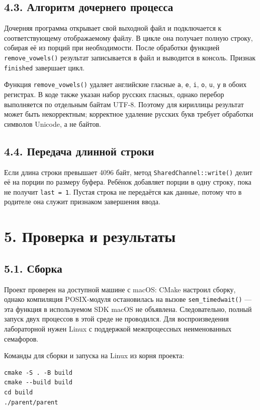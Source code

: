 \documentclass[12pt,a4paper]{article}
\begin{document}
\subsection*{4.3. Алгоритм дочернего процесса}
Дочерняя программа открывает свой выходной файл и подключается к соответствующему отображаемому файлу. В цикле она получает полную строку, собирая её из порций при необходимости. После обработки функцией \texttt{remove\_vowels()} результат записывается в файл и выводится в консоль. Признак \texttt{finished} завершает цикл.

Функция \texttt{remove\_vowels()} удаляет английские гласные \texttt{a}, \texttt{e}, \texttt{i}, \texttt{o}, \texttt{u}, \texttt{y} в обоих регистрах. В коде также указан набор русских гласных, однако перебор выполняется по отдельным байтам UTF-8. Поэтому для кириллицы результат может быть некорректным; корректное удаление русских букв требует обработки символов Unicode, а не байтов.

\subsection*{4.4. Передача длинной строки}
Если длина строки превышает 4096 байт, метод \texttt{SharedChannel::write()} делит её на порции по размеру буфера. Ребёнок добавляет порции в одну строку, пока не получит \texttt{last = 1}. Пустая строка не передаётся как данные, потому что в родителе она служит признаком завершения ввода.

\section*{5. Проверка и результаты}
\subsection*{5.1. Сборка}
Проект проверен на доступной машине с macOS: CMake настроил сборку, однако компиляция POSIX-модуля остановилась на вызове \texttt{sem\_timedwait()} --- эта функция в используемом SDK macOS не объявлена. Следовательно, полный запуск двух процессов в этой среде не проводился. Для воспроизведения лабораторной нужен Linux с поддержкой межпроцессных неименованных семафоров.

Команды для сборки и запуска на Linux из корня проекта:

\begin{verbatim}
cmake -S . -B build
cmake --build build
cd build
./parent/parent
\end{verbatim}
\end{document}
